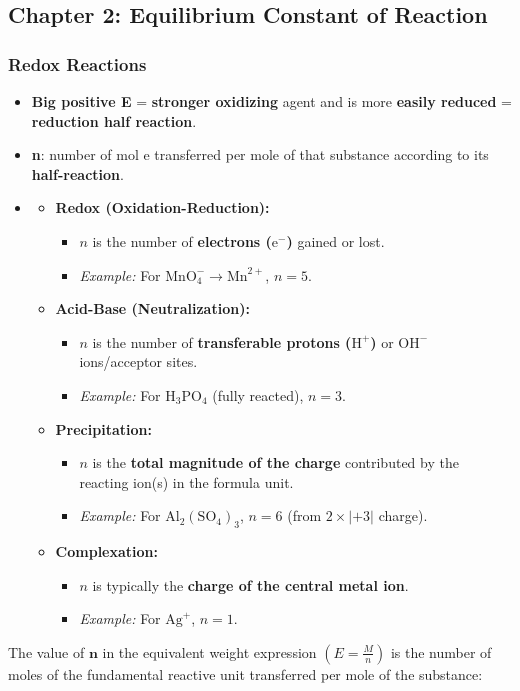 \subsection*{Chapter 2: Equilibrium Constant of Reaction}

\subsubsection*{Redox Reactions}
\begin{itemize}
    \item \textbf{Big positive E} = \textbf{stronger oxidizing} agent and is more \textbf{easily reduced} = \textbf{reduction half reaction}.
    \item \textbf{n}: number of mol e transferred per mole of that substance according to its \textbf{half-reaction}.
    \item \begin{itemize}
    \item \textbf{Redox (Oxidation-Reduction):}
    \begin{itemize}
        \item $n$ is the number of \textbf{electrons ($\mathrm{e}^-$)} gained or lost.
        \item \textit{Example:} For $\mathrm{MnO}_4^{-} \rightarrow \mathrm{Mn}^{2+}$, $n=5$.
    \end{itemize}

    \item 
    \textbf{Acid-Base (Neutralization):}
    \begin{itemize}
        \item $n$ is the number of \textbf{transferable protons ($\mathrm{H}^{+}$)} or $\mathrm{OH}^{-}$ ions/acceptor sites.
        \item \textit{Example:} For $\mathrm{H}_3\mathrm{PO}_4$ (fully reacted), $n=3$.
    \end{itemize}

    \item \textbf{Precipitation:}
    \begin{itemize}
        \item $n$ is the \textbf{total magnitude of the charge} contributed by the reacting ion(s) in the formula unit.
        \item \textit{Example:} For $\mathrm{Al}_2(\mathrm{SO}_4)_3$, $n = 6$ (from $2 \times |+3|$ charge).
    \end{itemize}

    \item \textbf{Complexation:}
    \begin{itemize}
        \item $n$ is typically the \textbf{charge of the central metal ion}.
        \item \textit{Example:} For $\mathrm{Ag}^{+}$, $n=1$.
    \end{itemize}
\end{itemize}

\end{itemize}
The value of $\mathbf{n}$ in the equivalent weight expression $\left(E = \frac{M}{n}\right)$ is the number of moles of the fundamental reactive unit transferred per mole of the substance:


